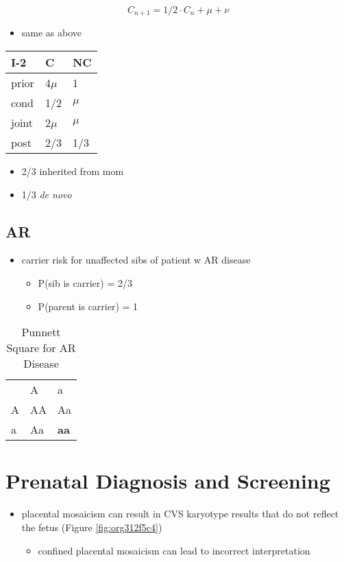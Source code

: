 \documentclass[12pt]{scrartcl}
\begin{document}
\[C_{n+1} = 1/2 \cdot C_n + \mu + \nu \]

\begin{itemize}
\item same as above
\end{itemize}

\begin{center}
\begin{tabular}{lll}
I-2 & C & NC\\
\hline
prior & 4\(\mu\) & 1\\
cond \footnotemark & 1/2 & \(\mu\)\\
joint & 2\(\mu\) & \(\mu\)\\
post & 2/3 & 1/3\\
\end{tabular}
\end{center}


\begin{itemize}
\item 2/3 inherited from mom
\item 1/3 \emph{de novo}
\end{itemize}

\subsection{AR}
\label{sec:org835ef1f}
\begin{itemize}
\item carrier risk for unaffected sibs of patient w AR disease
\begin{itemize}
\item P(sib is carrier) = 2/3
\item P(parent is carrier) = 1
\end{itemize}
\end{itemize}

\begin{table}[htbp]
\caption{\label{tab:org61f92e0}Punnett Square for AR Disease}
\centering
\begin{tabular}{lll}
 & A & a\\
A & AA & Aa\\
a & Aa & \textbf{aa}\\
\end{tabular}
\end{table}

\section{Prenatal Diagnosis and Screening}
\label{sec:orgdae2fcf}
\begin{itemize}
\item placental mosaicism can result in CVS karyotype results that do not
reflect the fetus (Figure \ref{fig:org312f5c4})
\begin{itemize}
\item confined placental mosaicism can lead to incorrect interpretation
\end{itemize}
\end{itemize}
\end{document}
